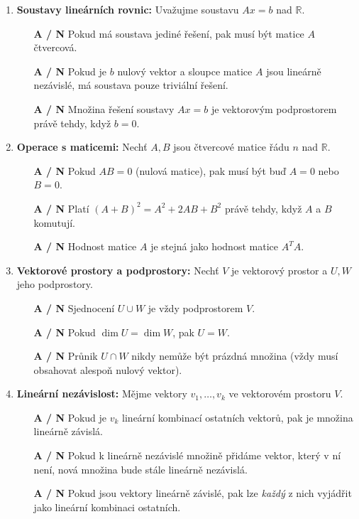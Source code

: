 \documentclass[a4paper,11pt]{article}
\begin{document}
\begin{enumerate}
    \item \textbf{Soustavy lineárních rovnic:} Uvažujme soustavu $Ax=b$ nad $\mathbb{R}$.
    \begin{itemize}
        \item[\textbf{A / N}] Pokud má soustava jediné řešení, pak musí být matice $A$ čtvercová.
        \item[\textbf{A / N}] Pokud je $b$ nulový vektor a sloupce matice $A$ jsou lineárně nezávislé, má soustava pouze triviální řešení.
        \item[\textbf{A / N}] Množina řešení soustavy $Ax=b$ je vektorovým podprostorem právě tehdy, když $b=0$.
    \end{itemize}

    \item \textbf{Operace s maticemi:} Nechť $A, B$ jsou čtvercové matice řádu $n$ nad $\mathbb{R}$.
    \begin{itemize}
        \item[\textbf{A / N}] Pokud $AB = 0$ (nulová matice), pak musí být buď $A=0$ nebo $B=0$.
        \item[\textbf{A / N}] Platí $(A+B)^2 = A^2 + 2AB + B^2$ právě tehdy, když $A$ a $B$ komutují.
        \item[\textbf{A / N}] Hodnost matice $A$ je stejná jako hodnost matice $A^T A$.
    \end{itemize}

    \item \textbf{Vektorové prostory a podprostory:} Nechť $V$ je vektorový prostor a $U, W$ jeho podprostory.
    \begin{itemize}
        \item[\textbf{A / N}] Sjednocení $U \cup W$ je vždy podprostorem $V$.
        \item[\textbf{A / N}] Pokud $\dim U = \dim W$, pak $U = W$.
        \item[\textbf{A / N}] Průnik $U \cap W$ nikdy nemůže být prázdná množina (vždy musí obsahovat alespoň nulový vektor).
    \end{itemize}

    \item \textbf{Lineární nezávislost:} Mějme vektory $v_1, \dots, v_k$ ve vektorovém prostoru $V$.
    \begin{itemize}
        \item[\textbf{A / N}] Pokud je $v_k$ lineární kombinací ostatních vektorů, pak je množina lineárně závislá.
        \item[\textbf{A / N}] Pokud k lineárně nezávislé množině přidáme vektor, který v ní není, nová množina bude stále lineárně nezávislá.
        \item[\textbf{A / N}] Pokud jsou vektory lineárně závislé, pak lze \textit{každý} z nich vyjádřit jako lineární kombinaci ostatních.
    \end{itemize}


\end{enumerate}
\end{document}
